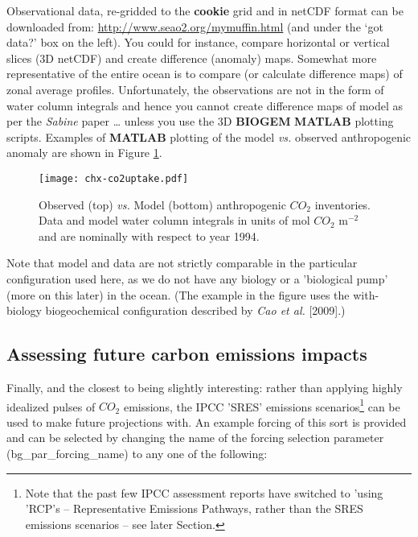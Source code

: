 Observational data, re-gridded to the \textbf{cookie} grid and in netCDF format can be downloaded from: \href{http://www.seao2.org/mymuffin.html}{http://www.seao2.org/mymuffin.html} (and under the ‘got data?’ box on the left). You could for instance, compare horizontal or vertical slices (3D netCDF) and create difference (anomaly) maps. Somewhat more representative of the entire ocean is to compare (or calculate difference maps) of zonal average profiles. Unfortunately, the observations are not in the form of water column integrals and hence you cannot create difference maps of model as per the \textit{Sabine} paper … unless you use the 3D \textbf{BIOGEM} \textbf{MATLAB} plotting scripts. Examples of \textbf{MATLAB} plotting of the model \textit{vs.} observed anthropogenic anomaly are shown in Figure \ref{fig:chx-co2uptake}.

\vspace{2mm}

\begin{figure}[ht]
\begin{center}
\texttt{[image: chx-co2uptake.pdf]}
\end{center}
\vspace{-10pt}
\caption{Observed (top) \textit{vs.} Model (bottom) anthropogenic \(CO_{2}\) inventories.
Data and model water column integrals in units of mol \(CO_{2}\) m$^{-2}$ and are nominally with respect to year 1994.}
\label{fig:chx-co2uptake}
\end{figure}

\noindent  Note that model and data are not strictly comparable in the particular configuration used here, as we do not have any biology or a 'biological pump' (more on this later) in the ocean. (The example in the figure uses the with-biology biogeochemical configuration described by \textit{Cao et al.} [2009].)

\newpage

\subsection{Assessing future carbon emissions impacts}

\noindent Finally, and the closest to being slightly interesting: rather than applying highly idealized pulses  of \(CO_{2}\) emissions, the IPCC 'SRES' emissions scenarios\footnote{Note that the past few IPCC assessment reports have switched to 'using 'RCP's -- Representative Emissions Pathways, rather than the SRES emissions scenarios -- see later Section.}  can be used to make future projections with. An example forcing of this sort is provided and can be selected by changing the name of the forcing selection parameter (\textsf{\footnotesize bg\_par\_forcing\_name}) to any one of the following:

